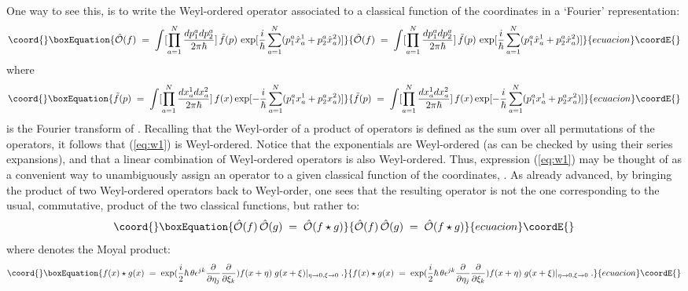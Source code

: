 \documentclass[a4paper,12pt]{article}
\begin{document}
One way to see this, is to write the Weyl-ordered operator
\coordHE{} associated to a classical function \coordHE{} of the coordinates
in
a `Fourier' representation:
\begin{equation}\coord{}\boxEquation{
  \label{eq:w1}
{\hat {\mathcal O}}(f)\;=\; \int [\prod_{a=1}^N \frac{dp_1^a
dp_2^a}{2\pi \hbar}]\,
{\tilde f}(p) \, \exp [ \frac{i}{\hbar} \sum_{a=1}^N (p_1^a {\hat
x}^1_a +
p_2^a {\hat x}^2_a)]
}{
  {\hat {\mathcal O}}(f)\;=\; \int [\prod_{a=1}^N \frac{dp_1^a
dp_2^a}{2\pi \hbar}]\,
{\tilde f}(p) \, \exp [ \frac{i}{\hbar} \sum_{a=1}^N (p_1^a {\hat
x}^1_a +
p_2^a {\hat x}^2_a)]
}{ecuacion}\coordE{}\end{equation}
where
\begin{equation}\coord{}\boxEquation{
  \label{eq:w2}
{\tilde f}(p) \;=\; \int [\prod_{a=1}^N \frac{dx^1_a dx^2_a}{2 \pi
\hbar}]\,
f(x) \exp [- \frac{i}{\hbar} \sum_{a=1}^N (p_1^a x^1_a +p_2^a
x^2_a) ]
}{
  {\tilde f}(p) \;=\; \int [\prod_{a=1}^N \frac{dx^1_a dx^2_a}{2 \pi
\hbar}]\,
f(x) \exp [- \frac{i}{\hbar} \sum_{a=1}^N (p_1^a x^1_a +p_2^a
x^2_a) ]
}{ecuacion}\coordE{}\end{equation}
is the Fourier transform of \coordHE{}. Recalling that the Weyl-order
of a
product of operators is defined as the sum over all permutations of
the operators, it follows that (\ref{eq:w1}) is Weyl-ordered.
Notice
that the exponentials are Weyl-ordered (as can be checked by using
their series expansions), and that a linear combination of
Weyl-ordered operators is also Weyl-ordered. Thus, expression
(\ref{eq:w1}) may be thought of as a convenient way to
unambiguously
assign an operator \coordHE{} to a given classical
function of the coordinates, \coordHE{}. As already advanced, by bringing
the
product of two Weyl-ordered operators back to Weyl-order, one sees
that the resulting operator is not the one corresponding to the
usual,
commutative, product of the two classical functions, but rather to:
\begin{equation}\coord{}\boxEquation{
  \label{eq:w3}
{\hat {\mathcal O}}(f) \, {\hat {\mathcal O}}(g) \;=\; 
{\hat {\mathcal O}}(f \star g )   
}{
  {\hat {\mathcal O}}(f) \, {\hat {\mathcal O}}(g) \;=\; 
{\hat {\mathcal O}}(f \star g )   
}{ecuacion}\coordE{}\end{equation} 
where \myHighlight{$\star$}\coordHE{} denotes the Moyal product:
\begin{equation}\coord{}\boxEquation{
  \label{eq:w4}
f(x) \star g (x) \;=\; \exp ( \frac{i}{2}\hbar \,\theta
\epsilon^{jk}
\frac{\partial}{\partial \eta_j} \frac{\partial}{\partial\xi_k})
f(x+\eta) \; g(x+\xi) |_{\eta \to 0, \xi \to 0} \;.
}{
  f(x) \star g (x) \;=\; \exp ( \frac{i}{2}\hbar \,\theta
\epsilon^{jk}
\frac{\partial}{\partial \eta_j} \frac{\partial}{\partial\xi_k})
f(x+\eta) \; g(x+\xi) |_{\eta \to 0, \xi \to 0} \;.
}{ecuacion}\coordE{}\end{equation}
\end{document}

